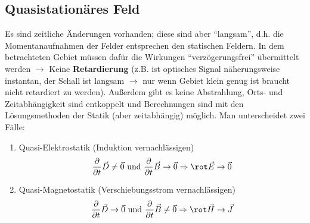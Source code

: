  \subsection{Quasistationäres Feld}
		   Es sind zeitliche Änderungen vorhanden; diese sind aber \enquote{langsam}, d.h. die Momentanaufnahmen der Felder entsprechen den statischen Feldern.
		   In dem betrachteten Gebiet müssen dafür die Wirkungen \enquote{verzögerungsfrei} übermittelt werden $\to$ Keine \textbf{Retardierung} (z.B. ist optisches Signal näherungsweise instantan, der Schall ist langsam $\to$ nur wenn Gebiet klein genug ist braucht nicht retardiert zu werden). Außerdem gibt es keine Abstrahlung,
		   Orts- und Zeitabhängigkeit sind entkoppelt und Berechnungen sind mit den Lösungsmethoden der Statik (aber zeitabhängig) möglich. Man unterscheidet zwei Fälle:
		        \begin{enumerate}
			        \item Quasi-Elektrostatik (Induktion vernachlässigen)
			              \begin{equation}\begin{split}
					              \dfrac{\partial}{\partial t}\vec{D}\neq \vec{0}\text{ und }\dfrac{\partial}
					              {\partial t}\vec{B}\to \vec{0}\Rightarrow \rot \vec{E}\to \vec{0}
				              \end{split}\end{equation}

			        \item Quasi-Magnetostatik (Verschiebungsstrom vernachlässigen)
			              \begin{equation}\begin{split}
					              \dfrac{\partial}{\partial t}\vec{D}\to \vec{0}\text{ und }\dfrac{\partial}
					              {\partial t}\vec{B}\neq \vec{0}\Rightarrow \rot \vec{H}\to \vec{J}
				              \end{split}\end{equation}
		        \end{enumerate}
